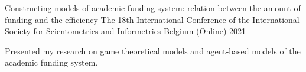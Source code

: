 \begin{cventries}
%
%
%
  \cventry
    {Constructing models of academic funding system: relation between the amount of funding and the efficiency} %
    {The 18th International Conference of the International Society for Scientometrics and Informetrics} %
    {Belgium (Online)} %
    {2021} %
    {
      \begin{cvitems} %
        \item {Presented my research on game theoretical models and agent-based models of the academic funding system.}
      \end{cvitems}
    }


\end{cventries}
